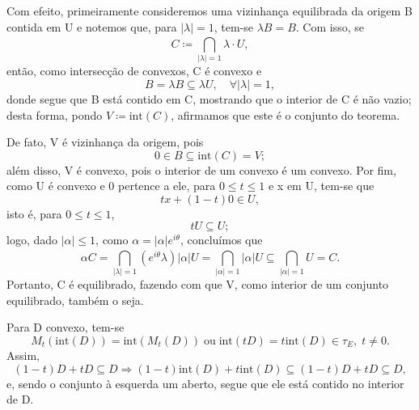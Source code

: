 \documentclass[../distribution_theory_notes.tex]{subfiles}
\begin{document}
\begin{proof*}
  Com efeito, primeiramente consideremos uma vizinhança equilibrada da origem B contida em U e notemos que, para \(|\lambda |=1\), tem-se \(\lambda B = B.\) Com isso, se 
    \[
      C\coloneqq \bigcap_{|\lambda |=1}^{}\lambda \cdot U,
    \]
    então, como intersecção de convexos, C é convexo e 
      \[
        B = \lambda B\subseteq \lambda U,\quad \forall |\lambda |=1,
      \] 
      donde segue que B está contido em C, mostrando que o interior de C é não vazio; desta forma, pondo \(V\coloneqq \mathrm{int}(C)\), afirmamos que este é o conjunto do teorema. 

      De fato, V é vizinhança da origem, pois 
        \[
          0\in B\subseteq \mathrm{int}(C)=V;
        \]
        além disso, V é convexo, pois o interior de um convexo é um convexo. Por fim, como U é convexo e 0 pertence a ele, para \(0\leq t\leq 1\) e x em U, tem-se que 
          \[
            tx + (1-t)0\in U,
          \]
          isto é, para \(0\leq t\leq 1\), 
            \[
              tU\subseteq U;
            \]
            logo, dado \(|\alpha |\leq 1\), como \(\alpha =|\alpha |e^{i\theta }\), concluímos que 
              \[
                \alpha C = \bigcap_{|\lambda |=1}^{}(e^{i\theta }\lambda )|\alpha |U = \bigcap_{|\alpha |=1}^{}|\alpha | U \subseteq \bigcap_{|\alpha |=1}^{}U = C.
              \]
              Portanto, C é equilibrado, fazendo com que V, como interior de um conjunto equilibrado, também o seja. \qedsymbol

\end{proof*}

  \begin{tcolorbox}[
  skin=enhanced,
  title=Lembrete!,
  after title={\hfill Interior de Convexo},
  fonttitle=\bfseries,
  sharp corners=downhill,
colframe=black,
  colbacktitle=yellow!75!white, 
  colback=yellow!30,
  colbacklower=black,
coltitle=black,
  drop large lifted shadow
  ]
  Para D convexo, tem-se 
    \[
      M_t(\mathrm{int}(D))=\mathrm{int}(M_t(D))\;\text{ou}\; \mathrm{int}(tD)=t \mathrm{int}(D)\in \tau_{E},\; t\neq 0.
    \] 
    Assim, 
      \[
        (1-t)D + tD\subseteq D \Rightarrow (1-t)\mathrm{int}(D)+t \mathrm{int}(D) \subseteq (1-t)D + tD \subseteq D,
      \]
      e, sendo o conjunto à esquerda um aberto, segue que ele está contido no interior de D.
  \end{tcolorbox}
\end{document}
